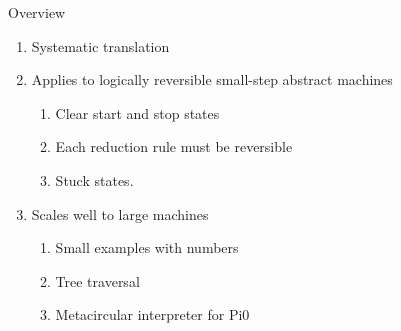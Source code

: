 \documentclass[svgnames,11pt]{beamer}
\begin{document}
\begin{frame}{Overview}

  \begin{enumerate}
\vfill
  \item Systematic translation
\vfill
  \item Applies to logically reversible small-step abstract machines
    \begin{enumerate}
    \item Clear start and stop states
    \item Each reduction rule must be reversible
    \item Stuck states.
    \end{enumerate}
\vfill
  \item Scales well to large machines
    \begin{enumerate}
    \item Small examples with numbers
    \item Tree traversal
    \item Metacircular interpreter for {{Pi0}}
    \end{enumerate}

  \end{enumerate}
\vfill

\end{frame}
\end{document}
